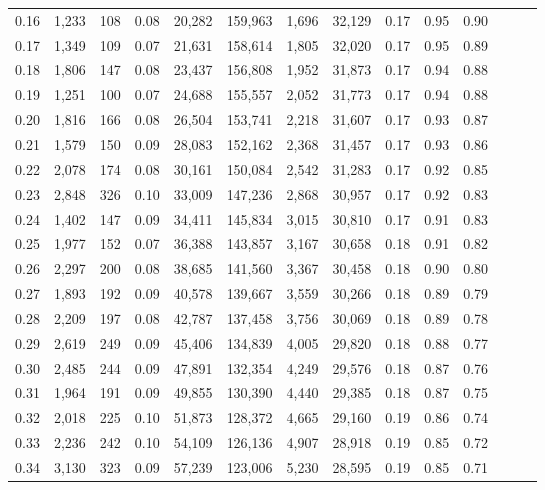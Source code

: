 \begin{tabular}{rrrrrrrrrrrrrr}
0.16 &  1,233 &  108 &  0.08 &   20,282 &  159,963 &   1,696 &  32,129 &  0.17 &  0.95 &      0.90 \\
0.17 &  1,349 &  109 &  0.07 &   21,631 &  158,614 &   1,805 &  32,020 &  0.17 &  0.95 &      0.89 \\
0.18 &  1,806 &  147 &  0.08 &   23,437 &  156,808 &   1,952 &  31,873 &  0.17 &  0.94 &      0.88 \\
0.19 &  1,251 &  100 &  0.07 &   24,688 &  155,557 &   2,052 &  31,773 &  0.17 &  0.94 &      0.88 \\
0.20 &  1,816 &  166 &  0.08 &   26,504 &  153,741 &   2,218 &  31,607 &  0.17 &  0.93 &      0.87 \\
0.21 &  1,579 &  150 &  0.09 &   28,083 &  152,162 &   2,368 &  31,457 &  0.17 &  0.93 &      0.86 \\
0.22 &  2,078 &  174 &  0.08 &   30,161 &  150,084 &   2,542 &  31,283 &  0.17 &  0.92 &      0.85 \\
0.23 &  2,848 &  326 &  0.10 &   33,009 &  147,236 &   2,868 &  30,957 &  0.17 &  0.92 &      0.83 \\
0.24 &  1,402 &  147 &  0.09 &   34,411 &  145,834 &   3,015 &  30,810 &  0.17 &  0.91 &      0.83 \\
0.25 &  1,977 &  152 &  0.07 &   36,388 &  143,857 &   3,167 &  30,658 &  0.18 &  0.91 &      0.82 \\
0.26 &  2,297 &  200 &  0.08 &   38,685 &  141,560 &   3,367 &  30,458 &  0.18 &  0.90 &      0.80 \\
0.27 &  1,893 &  192 &  0.09 &   40,578 &  139,667 &   3,559 &  30,266 &  0.18 &  0.89 &      0.79 \\
0.28 &  2,209 &  197 &  0.08 &   42,787 &  137,458 &   3,756 &  30,069 &  0.18 &  0.89 &      0.78 \\
0.29 &  2,619 &  249 &  0.09 &   45,406 &  134,839 &   4,005 &  29,820 &  0.18 &  0.88 &      0.77 \\
0.30 &  2,485 &  244 &  0.09 &   47,891 &  132,354 &   4,249 &  29,576 &  0.18 &  0.87 &      0.76 \\
0.31 &  1,964 &  191 &  0.09 &   49,855 &  130,390 &   4,440 &  29,385 &  0.18 &  0.87 &      0.75 \\
0.32 &  2,018 &  225 &  0.10 &   51,873 &  128,372 &   4,665 &  29,160 &  0.19 &  0.86 &      0.74 \\
0.33 &  2,236 &  242 &  0.10 &   54,109 &  126,136 &   4,907 &  28,918 &  0.19 &  0.85 &      0.72 \\
0.34 &  3,130 &  323 &  0.09 &   57,239 &  123,006 &   5,230 &  28,595 &  0.19 &  0.85 &      0.71 \\

\end{tabular}
